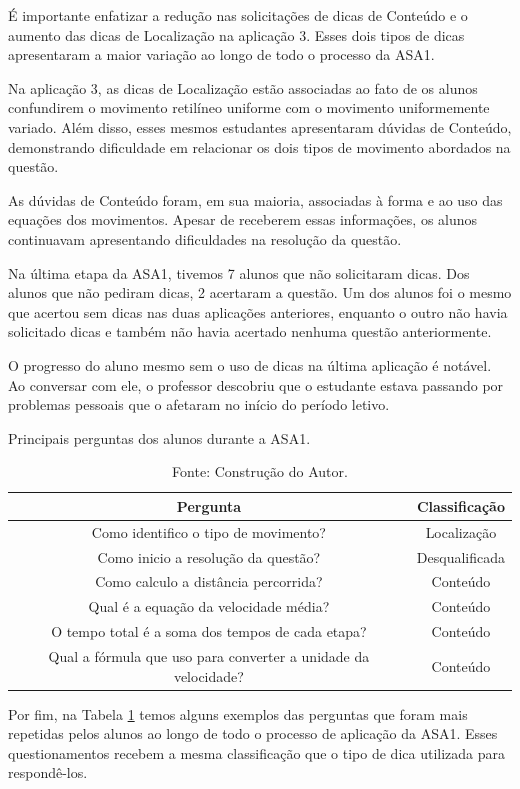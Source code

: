 É importante enfatizar a redução nas solicitações de dicas de Conteúdo e o aumento das dicas de Localização na aplicação 3. Esses dois tipos de dicas apresentaram a maior variação ao longo de todo o processo da ASA1.

Na aplicação 3, as dicas de Localização estão associadas ao fato de os alunos confundirem o movimento retilíneo uniforme com o movimento uniformemente variado. Além disso, esses mesmos estudantes apresentaram dúvidas de Conteúdo, demonstrando dificuldade em relacionar os dois tipos de movimento abordados na questão.

As dúvidas de Conteúdo foram, em sua maioria, associadas à forma e ao uso das equações dos movimentos. Apesar de receberem essas informações, os alunos continuavam apresentando dificuldades na resolução da questão.

Na última etapa da ASA1, tivemos 7 alunos que não solicitaram dicas. Dos alunos que não pediram dicas, 2 acertaram a questão. Um dos alunos foi o mesmo que acertou sem dicas nas duas aplicações anteriores, enquanto o outro não havia solicitado dicas e também não havia acertado nenhuma questão anteriormente.

O progresso do aluno mesmo sem o uso de dicas na última aplicação é notável. Ao conversar com ele, o professor descobriu que o estudante estava passando por problemas pessoais que o afetaram no início do período letivo.

\begin{table}[ht]
\centering
\caption{Principais perguntas dos alunos durante a ASA1.} \label{tab:pergASA1}
\begin{tabular}{c|c}
\hline
\textbf{Pergunta} & \textbf{Classificação}\\ \hline
Como identifico o tipo de movimento? & Localização\\ 
Como inicio a resolução da questão? & Desqualificada \\ 
Como calculo a distância percorrida? & Conteúdo \\
Qual é a equação da velocidade média? & Conteúdo \\
O tempo total é a soma dos tempos de cada etapa? & Conteúdo \\
Qual a fórmula que uso para converter a unidade da velocidade? & Conteúdo \\
\hline
\end{tabular}
\caption*{Fonte: Construção do Autor.}
\end{table}


Por fim, na Tabela \ref{tab:pergASA1} temos alguns exemplos das perguntas que foram mais repetidas pelos alunos ao longo de todo o processo de aplicação da ASA1. Esses questionamentos recebem a mesma classificação que o tipo de dica utilizada para respondê-los.

